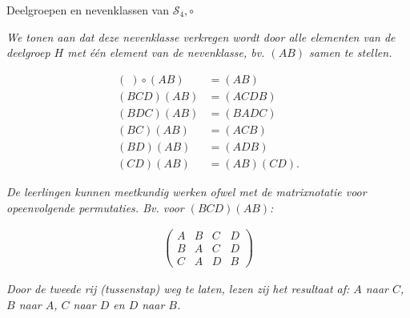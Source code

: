 \begin{lesactiviteit} {Deelgroepen en nevenklassen van $\mathscr{S}_4, \circ$}
\begin{vraagenantwoord}
\begin{itemize}
\end{itemize}



\emph{We tonen aan dat deze nevenklasse verkregen wordt door alle elementen van de deelgroep $H$ met één element van de nevenklasse, bv. $(AB)$ samen te stellen.}
\begin{center}
$$
\begin{array}{ll}
    (\;)\circ(AB)&=(AB)\\
    (BCD)(AB)&=(ACDB)\\
    (BDC)(AB)&=(BADC)\\
    (BC)(AB)&=(ACB)\\
    (BD)(AB)&=(ADB)\\
    (CD)(AB)&=(AB)(CD).
        \end{array}
$$
\end{center}

\emph{De leerlingen kunnen meetkundig werken ofwel met de matrixnotatie voor opeenvolgende permutaties. Bv. voor $(BCD)(AB)$:}

\begin{center}

	\begin{align*}
    \left( \begin{matrix}
        A&B&C&D\\
        B&A&C&D\\
        C&A&D&B
    \end{matrix}
    \right)
    \end{align*}
 
 \end{center}
 
 \emph{Door de tweede rij (tussenstap) weg te laten, lezen zij het resultaat af: $A$ naar $C$, $B$ naar $A$, $C$ naar $D$ en $D$ naar $B$.}

\end{vraagenantwoord}

\end{lesactiviteit}

\stopcontents[inhoudloep]		

